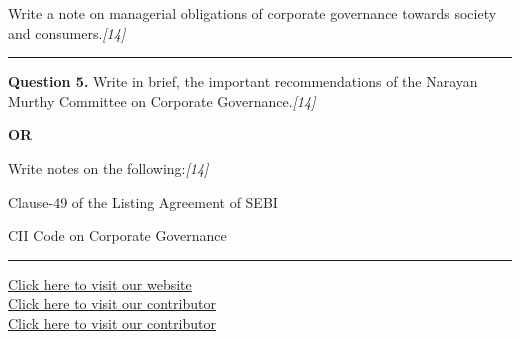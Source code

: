 \documentclass[11pt,a4paper]{article}
\newcommand{\pts}[1]{\hfill   \textit{[#1]}}
\begin{document}
Write a note on managerial obligations of corporate governance towards society and consumers.\pts{14}

\medskip\rule{\linewidth}{0.2pt}




\noindent   \textbf{Question 5.}
Write in brief, the important recommendations of the Narayan Murthy Committee on Corporate Governance.\pts{14}

\centerline{   \textbf{OR}}

Write notes on the following:\pts{14}

\begin{parts}
  \item Clause-49 of the Listing Agreement of SEBI
  \item CII Code on Corporate Governance
\end{parts}

\vfill
\rule{\linewidth}{0.4pt}

\begin{center}\small
\href{https://bhu-exam.vercel.app/}{Click here to visit our website}\\[4pt]
\href{https://me-aryan.vercel.app/}{Click here to visit our contributor}\\[4pt]
\href{https://quashan-me.vercel.app/}{Click here to visit our contributor}
\end{center}
\end{document}
